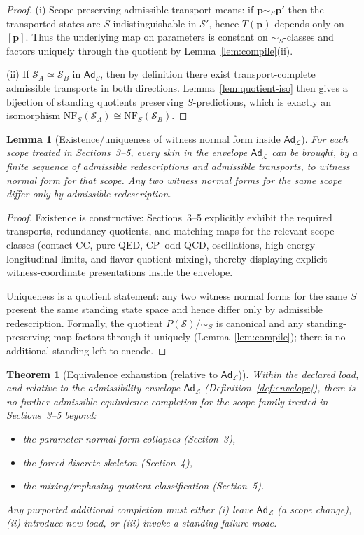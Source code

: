 \documentclass[11pt]{article}
\newtheorem{theorem}[definition]{Theorem}
\newtheorem{lemma}[definition]{Lemma}
\theoremstyle{remark}
\newcommand{\Skin}{\mathcal{S}}
\newcommand{\Load}{\mathcal{L}}
\newcommand{\Ad}{\ensuremath{\mathsf{Ad}}}
\begin{document}
\begin{proof}
(i) Scope-preserving admissible transport means: if $\mathbf{p}\sim_S\mathbf{p}'$ then the transported states are
$S$-indistinguishable in $\Skin'$, hence $T(\mathbf{p})$ depends only on $[\mathbf{p}]$.
Thus the underlying map on parameters is constant on $\sim_S$-classes and factors uniquely through the quotient by
Lemma~\ref{lem:compile}(ii).

(ii) If $\Skin_A\simeq\Skin_B$ in $\Ad_S$, then by definition there exist transport-complete admissible transports
in both directions. Lemma~\ref{lem:quotient-iso} then gives a bijection of standing quotients preserving
$S$-predictions, which is exactly an isomorphism
$\mathrm{NF}_S(\Skin_A)\cong\mathrm{NF}_S(\Skin_B)$.
\end{proof}

\begin{lemma}[Existence/uniqueness of witness normal form inside $\Ad_{\Load}$]\label{lem:nf}
For each scope treated in Sections~3--5, every skin in the envelope $\Ad_{\Load}$ can be brought, by a finite
sequence of admissible redescriptions and admissible transports, to witness normal form for that scope.
Any two witness normal forms for the same scope differ only by admissible redescription.
\end{lemma}

\begin{proof}
Existence is constructive: Sections~3--5 explicitly exhibit the required transports, redundancy quotients,
and matching maps for the relevant scope classes (contact CC, pure QED, CP--odd QCD, oscillations,
high-energy longitudinal limits, and flavor-quotient mixing), thereby displaying explicit witness-coordinate
presentations inside the envelope.

Uniqueness is a quotient statement: any two witness normal forms for the same $S$ present the same standing
state space and hence differ only by admissible redescription.
Formally, the quotient $P(\Skin)/\!\sim_S$ is canonical and any standing-preserving map factors through it
uniquely (Lemma~\ref{lem:compile}); there is no additional standing left to encode.
\end{proof}

\begin{theorem}[Equivalence exhaustion (relative to $\Ad_{\Load}$)]\label{thm:exhaustion}
Within the declared load, and relative to the admissibility envelope $\Ad_{\Load}$ (Definition~\ref{def:envelope}),
there is no further admissible equivalence completion for the scope family treated in Sections~3--5 beyond:
\begin{itemize}[leftmargin=2.2em]
\item the parameter normal-form collapses (Section~3),
\item the forced discrete skeleton (Section~4),
\item the mixing/rephasing quotient classification (Section~5).
\end{itemize}
Any purported additional completion must either (i) leave $\Ad_{\Load}$ (a scope change),
(ii) introduce new load, or (iii) invoke a standing-failure mode.
\end{theorem}
\end{document}
